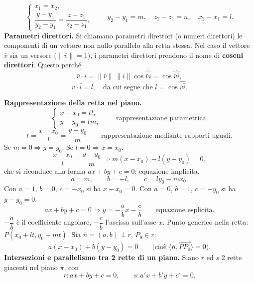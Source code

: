 \documentclass[11pt,a4paper]{article}
\newcommand{\pagina}[1]{\clearpage}
\begin{document}
\[\begin{cases}x_1=x_2,\\\dfrac{y-y_1}{y_2-y_1}=\dfrac{z-z_1}{z_2-z_1},\end{cases}\qquad y_2-y_1=m,\quad z_2-z_1=n,\quad x_2-x_1=l.\]
\textbf{Parametri direttori.} Si chiamano parametri direttori (o numeri direttori) le componenti di un vettore non nullo parallelo alla retta stessa. Nel caso il vettore $\bar v$ sia un versore ($\|\bar v\|=1$), i parametri direttori prendono il nome di \textbf{coseni direttori}. Questo perché
\[\bar v\cdot\bar i=\|\bar v\|\,\|\bar i\|\cos\widehat{\bar v\bar i}=\cos\widehat{\bar v\bar i},\]
\[\bar v\cdot\bar i=l,\quad\text{da cui segue che }l=\cos\widehat{\bar v\bar i}.\]

\pagina{60}
\textbf{Rappresentazione della retta nel piano.}
\[\begin{cases}x-x_0=tl,\\y-y_0=tm,\end{cases}\qquad\text{rappresentazione parametrica}.\]
\[t=\frac{x-x_0}{l}=\frac{y-y_0}{m}\qquad\text{rappresentazione mediante rapporti uguali}.\]
Se $m=0\Longrightarrow y=y_0$. Se $l=0\Longrightarrow x=x_0$.
\[\frac{x-x_0}{l}=\frac{y-y_0}{m}\Longrightarrow m(x-x_0)-l(y-y_0)=0,\]
che si riconduce alla forma $ax+by+c=0$: equazione implicita.
\[a=m,\qquad b=-l,\qquad c=ly_0-mx_0.\]
Con $a=1$, $b=0$, $c=-x_0$ si ha $x-x_0=0$.
Con $a=0$, $b=1$, $c=-y_0$ si ha $y-y_0=0$.
\[ax+by+c=0\Longrightarrow y=-\frac abx-\frac cb\qquad\text{equazione esplicita}.\]
$-\dfrac ab$ è il coefficiente angolare, $-\dfrac cb$ l'ascissa sull'asse $x$.
Punto generico nella retta: $P(x_0+lt,y_0+mt)$.
Sia $\bar n=(a,b)\perp r$, $P_0\in r$:
\[a(x-x_0)+b(y-y_0)=0\qquad\bigl(\text{cioè }\langle\bar n,\overrightarrow{PP_0}\rangle=0\bigr).\]
\textbf{Intersezioni e parallelismo tra 2 rette di un piano.}
Siano $r$ ed $s$ 2 rette giacenti nel piano $\pi$, con
\[r:ax+by+c=0,\qquad s:a'x+b'y+c'=0.\]
\end{document}
